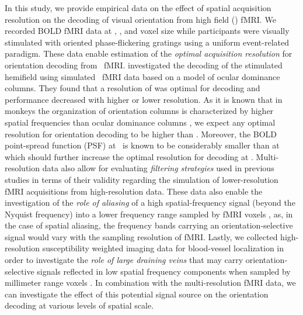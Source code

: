 In this study, we provide empirical data on the effect of spatial acquisition
resolution on the decoding of visual orientation from high field (\sevenT)
fMRI. We recorded BOLD fMRI data at , ,  and  voxel
size while participants were visually stimulated with oriented phase-flickering
gratings using a uniform event-related paradigm.
These data enable estimation of the \textit{optimal acquisition resolution} for
orientation decoding from \sevenT\ fMRI.  \citet{chaimow_2011} investigated the
decoding of the stimulated hemifield using simulated \threeT\ fMRI data based
on a model of ocular dominance columns. They found that a resolution of 
was optimal for decoding and performance decreased with higher or lower
resolution.  As it is known that in monkeys the organization of orientation
columns is characterized by higher spatial frequencies than ocular dominance
columns \citep{obermayer_1993}, we expect any optimal resolution for
orientation decoding to be higher than . Moreover, the BOLD point-spread
function (PSF) at \sevenT\ is known to be considerably smaller than at \threeT\
\citep[ FWHM vs.   FWHM][]{shmuel_2007,
engel_1997} which should further increase the optimal resolution for decoding
at \sevenT.
Multi-resolution data also allow for evaluating \textit{filtering strategies}
used in previous studies in terms of their validity regarding the simulation of
lower-resolution fMRI acquisitions from high-resolution data.
These data also enable the investigation of the \textit{role of aliasing} of a
high spatial-frequency signal (beyond the Nyquist frequency) into a
lower frequency range sampled by fMRI voxels \citep[sometimes referred to as
“hyperacuity”;][]{swisher_2010,opdebeeck_2010}, as, in the case of spatial
aliasing, the frequency bands carrying an orientation-selective signal would
vary with the sampling resolution of fMRI.
Lastly, we collected high-resolution susceptibility weighted imaging data for
blood-vessel localization in order to investigate the \textit{role of large
draining veins} that may carry orientation-selective signals reflected in low
spatial frequency components when sampled by millimeter range voxels
\citep{kamitani_2005,kriegeskorte_2007,shmuel_2010, gardner_2010}. In
combination with the multi-resolution fMRI data, we can investigate the effect
of this potential signal source on the orientation decoding at various levels
of spatial scale.



